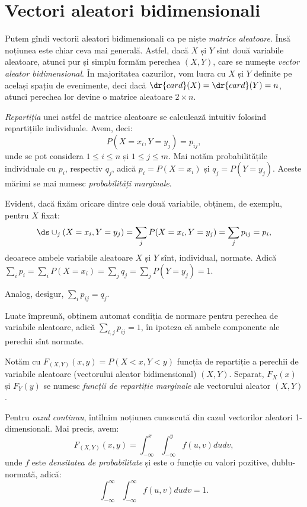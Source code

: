 
\chapter{Vectori aleatori bidimensionali}

Putem gîndi vectorii aleatori bidimensionali ca pe niște \emph{matrice %
  aleatoare}. Însă noțiunea este chiar ceva mai generală. Astfel, dacă
$ X $ și $ Y $ sînt două variabile aleatoare, atunci pur și simplu
formăm perechea $ (X, Y) $, care se numește \emph{vector aleator bidimensional}.
În majoritatea cazurilor, vom lucra cu $ X $ și $ Y $ definite pe același spațiu
de evenimente, deci dacă $ \dr{card}(X) = \dr{card}(Y) = n $, atunci perechea
lor devine o matrice aleatoare $ 2 \times n $.

\emph{Repartiția} unei astfel de matrice aleatoare se calculează intuitiv
folosind repartițiile individuale. Avem, deci:
\[
  P(X = x_i, Y = y_j) = p_{ij},
\]
unde se pot considera $ 1 \leq i \leq n $ și $ 1 \leq j \leq m $.
Mai notăm probabilitățile individuale cu $ p_i $, respectiv $ q_j $,
adică $ p_i = P(X = x_i) $ și $ q_j = P(Y = y_j) $. Aceste mărimi se mai
numesc \emph{probabilități marginale}.

Evident, dacă fixăm oricare dintre cele două variabile, obținem, de exemplu,
pentru $ X $ fixat:
\[
  \ds\cup_j (X = x_i, Y = y_j) = \sum_j P(X = x_i, Y = y_j) = \sum_j p_{ij} = p_i,
\]
deoarece ambele variabile aleatoare $ X $ și $ Y $ sînt, individual, normate.
Adică $ \sum_i p_i = \sum_i P(X = x_i) = \sum_j q_j = \sum_j P(Y = y_j) = 1 $.

Analog, desigur, $ \sum_i p_{ij} = q_j $.

Luate împreună, obținem automat condiția de normare pentru perechea de
variabile aleatoare, adică $ \sum_{i,j} p_{ij} = 1 $, în ipoteza că ambele
componente ale perechii sînt normate.

Notăm cu $ F_{(X, Y)}(x, y) = P(X < x, Y < y) $ funcția de repartiție
a perechii de variabile aleatoare (vectorului aleator bidimensional) $ (X, Y) $.
Separat, $ F_X(x) $ și $ F_Y(y) $ se numesc \emph{funcții de repartiție marginale}
ale vectorului aleator $ (X, Y) $.

Pentru \emph{cazul continuu}, întîlnim noțiunea cunoscută din cazul vectorilor
aleatori 1-dimensionali. Mai precis, avem:
\[
  F_{(X, Y)} (x, y) = \int_{-\infty}^x \int_{-\infty}^y f(u, v) dudv,
\]
unde $ f $ este \emph{densitatea de probabilitate} și este o funcție cu
valori pozitive, dublu-normată, adică:
\[
  \int_{-\infty}^\infty \int_{-\infty}^\infty f(u, v) du dv = 1.
\]

